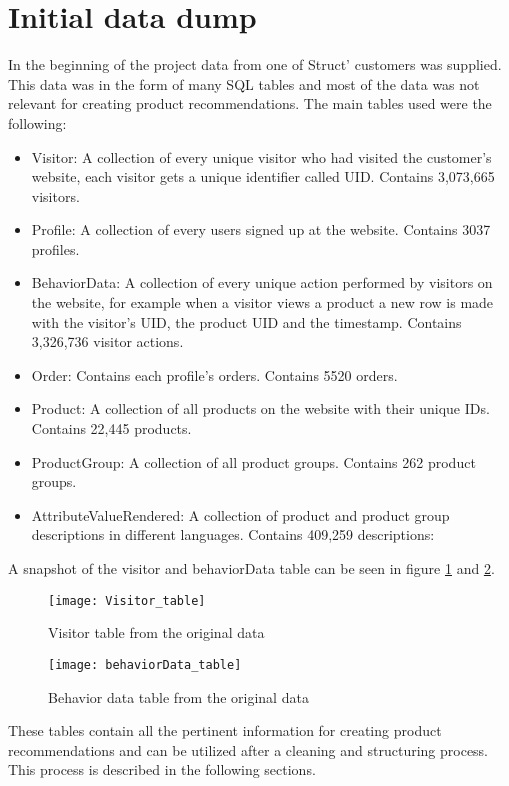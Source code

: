 \color{red}\section{Initial data dump}
In the beginning of the project data from one of \gls{Struct}' customers was supplied. This data was in the form of many SQL tables and most of the data was not relevant for creating product recommendations. The main tables used were the following:  \\
\begin{itemize}
	\item Visitor: A collection of every unique visitor who had visited the customer's website, each visitor gets a unique identifier called UID. Contains 3,073,665  visitors.
	\item Profile: A collection of every users signed up at the website. Contains 3037 profiles.
	\item BehaviorData: A collection of every unique action performed by visitors on the website, for example when a visitor views a product a new row is made with the visitor's UID, the product UID and the timestamp. Contains 3,326,736 visitor actions.
	\item Order: Contains each profile's orders. Contains 5520 orders.
	\item Product: A collection of all products on the website with their unique IDs. Contains 22,445 products.
	\item ProductGroup: A collection of all product groups. Contains 262 product groups.
	\item AttributeValueRendered: A collection of product and product group descriptions in different languages. Contains 409,259 descriptions:
	
\end{itemize}

A snapshot of the visitor and behaviorData table can be seen in figure \ref{visitorTable} and \ref{behaviorTable}.

\begin{figure}[H]
	\texttt{[image: Visitor\_table]}
	\caption{Visitor table from the original data}
	\label{visitorTable}
\end{figure}
\begin{figure}[H]
	\texttt{[image: behaviorData\_table]}
	\caption{Behavior data table from the original data}
	\label{behaviorTable}
\end{figure}

These tables contain all the pertinent information for creating product recommendations and can be utilized after a cleaning and structuring process. This process is described in the following sections.
